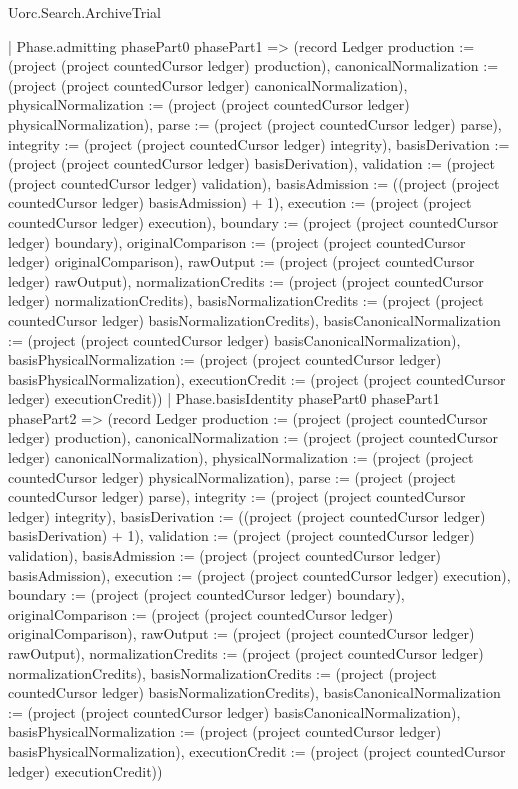 \begin{lexlean}{Uorc.Search.ArchiveTrial}
\begin{semanticmodule}
{{      | Phase.admitting phasePart0 phasePart1 => (record Ledger {production := (project (project countedCursor ledger) production), canonicalNormalization := (project (project countedCursor ledger) canonicalNormalization), physicalNormalization := (project (project countedCursor ledger) physicalNormalization), parse := (project (project countedCursor ledger) parse), integrity := (project (project countedCursor ledger) integrity), basisDerivation := (project (project countedCursor ledger) basisDerivation), validation := (project (project countedCursor ledger) validation), basisAdmission := ((project (project countedCursor ledger) basisAdmission) + 1), execution := (project (project countedCursor ledger) execution), boundary := (project (project countedCursor ledger) boundary), originalComparison := (project (project countedCursor ledger) originalComparison), rawOutput := (project (project countedCursor ledger) rawOutput), normalizationCredits := (project (project countedCursor ledger) normalizationCredits), basisNormalizationCredits := (project (project countedCursor ledger) basisNormalizationCredits), basisCanonicalNormalization := (project (project countedCursor ledger) basisCanonicalNormalization), basisPhysicalNormalization := (project (project countedCursor ledger) basisPhysicalNormalization), executionCredit := (project (project countedCursor ledger) executionCredit)})
      | Phase.basisIdentity phasePart0 phasePart1 phasePart2 => (record Ledger {production := (project (project countedCursor ledger) production), canonicalNormalization := (project (project countedCursor ledger) canonicalNormalization), physicalNormalization := (project (project countedCursor ledger) physicalNormalization), parse := (project (project countedCursor ledger) parse), integrity := (project (project countedCursor ledger) integrity), basisDerivation := ((project (project countedCursor ledger) basisDerivation) + 1), validation := (project (project countedCursor ledger) validation), basisAdmission := (project (project countedCursor ledger) basisAdmission), execution := (project (project countedCursor ledger) execution), boundary := (project (project countedCursor ledger) boundary), originalComparison := (project (project countedCursor ledger) originalComparison), rawOutput := (project (project countedCursor ledger) rawOutput), normalizationCredits := (project (project countedCursor ledger) normalizationCredits), basisNormalizationCredits := (project (project countedCursor ledger) basisNormalizationCredits), basisCanonicalNormalization := (project (project countedCursor ledger) basisCanonicalNormalization), basisPhysicalNormalization := (project (project countedCursor ledger) basisPhysicalNormalization), executionCredit := (project (project countedCursor ledger) executionCredit)})
}}
\end{semanticmodule}
\end{lexlean}
